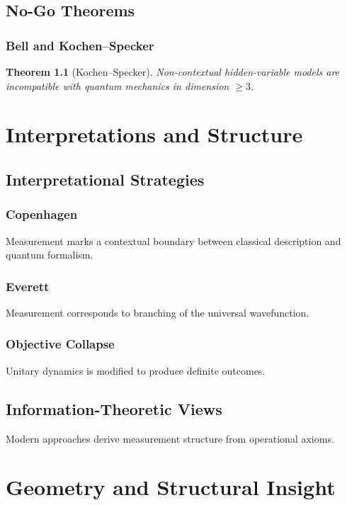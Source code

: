 \documentclass[12pt]{book}
\theoremstyle{plain}
\newtheorem{theorem}{Theorem}[chapter]
\theoremstyle{definition}
\theoremstyle{remark}
\begin{document}
\chapter{No-Go Theorems}

\section{Bell and Kochen--Specker}

\begin{theorem}[Kochen--Specker]
Non-contextual hidden-variable models are incompatible with quantum mechanics in dimension $\ge 3$.
\end{theorem}

\part{Interpretations and Structure}

\chapter{Interpretational Strategies}

\section{Copenhagen}
Measurement marks a contextual boundary between classical description and quantum formalism.

\section{Everett}
Measurement corresponds to branching of the universal wavefunction.

\section{Objective Collapse}
Unitary dynamics is modified to produce definite outcomes.

\chapter{Information-Theoretic Views}
Modern approaches derive measurement structure from operational axioms.

\part{Geometry and Structural Insight}
\end{document}

